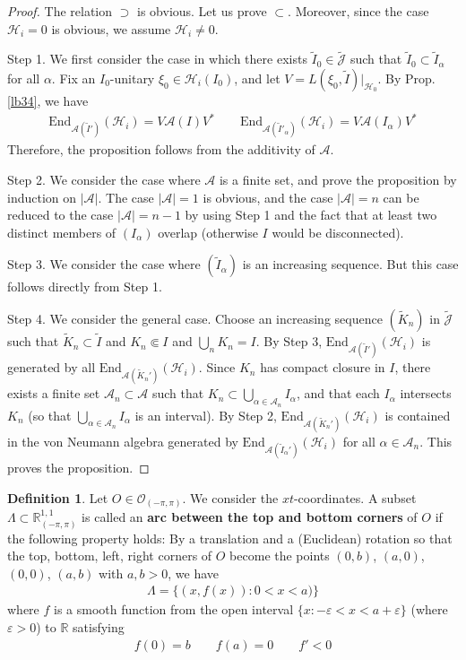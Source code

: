 \documentclass[11pt,b5paper,notitlepage]{article}
\theoremstyle{definition}
\newtheorem{df}{Definition}[section]
\theoremstyle{plain}
\newcommand{\wtd}{\widetilde}
\newcommand{\End}{\mathrm{End}} %
\newcommand{\scr}{\mathscr}
\newcommand{\Jtd}{\widetilde{\mathcal J}}
\newcommand{\Rbb}{\mathbb R}
\newcommand{\eps}{\varepsilon}
\newcommand{\MA}{\mathcal A}
\newcommand{\MH}{\mathcal H}
\newcommand{\Rpp}{\mathbb R^{1,1}_{(-\pi,\pi)}}
\newcommand{\Opp}{\mathcal O_{(-\pi,\pi)}}
\numberwithin{equation}{section}
\begin{document}
\begin{proof}
The relation $\supset$ is obvious. Let us prove $\subset$. Moreover, since the case $\MH_i=0$ is obvious, we assume $\MH_i\neq0$.

Step 1. We first consider the case in which there exists $\wtd I_0\in\Jtd$ such that $\wtd I_0\subset\wtd I_\alpha$ for all $\alpha$. Fix an $I_0$-unitary $\xi_0\in\MH_i(I_0)$, and let $V=L(\xi_0,\wtd I)|_{\MH_0}$. By Prop. \ref{lb34}, we have
\begin{align*}
\End_{\MA(\wtd I')}(\MH_i)=V\MA(I)V^*\qquad \End_{\MA(\wtd I'_\alpha)}(\MH_i)=V\MA(I_\alpha)V^*
\end{align*}
Therefore, the proposition follows from the additivity of $\MA$.

Step 2. We consider the case where $\scr A$ is a finite set, and prove the proposition by induction on $|\scr A|$. The case $|\scr A|=1$ is obvious, and the case $|\scr A|=n$ can be reduced to the case $|\scr A|=n-1$ by using Step 1 and the fact that at least two distinct members of $(I_\alpha)$ overlap (otherwise $I$ would be disconnected).

Step 3. We consider the case where $(\wtd I_\alpha)$ is an increasing sequence. But this case follows directly from Step 1.

Step 4. We consider the general case. Choose an increasing sequence $(\wtd K_n)$ in $\Jtd$ such that $\wtd K_n\subset \wtd I$ and $K_n\Subset I$ and $\bigcup_n K_n=I$. By Step 3, $\End_{\MA(\wtd I')}(\MH_i)$ is generated by all $\End_{\MA(\wtd K_n')}(\MH_i)$. Since $K_n$ has compact closure in $I$, there exists a finite set $\scr A_n\subset\scr A$ such that $K_n\subset\bigcup_{\alpha\in\scr A_n}I_\alpha$, and that each $I_\alpha$ intersects $K_n$ (so that $\bigcup_{\alpha\in\scr A_n}I_\alpha$ is an interval). By Step 2,  $\End_{\MA(\wtd K_n')}(\MH_i)$ is contained in the von Neumann algebra generated by $\End_{\MA(\wtd I_\alpha')}(\MH_i)$ for all $\alpha\in\scr A_n$. This proves the proposition.
\end{proof}




\begin{df}\label{lb70}
Let $O\in\Opp$. We consider the $xt$-coordinates. A subset $\Lambda\subset\Rpp$ is called an \textbf{arc between the top and bottom corners} of $O$ if the following property holds: By a translation and a (Euclidean) rotation so that the top, bottom, left, right corners of $O$ become the points $(0,b)$, $(a,0)$, $(0,0)$, $(a,b)$ with $a,b>0$, we have
\begin{align*}
\Lambda=\{(x,f(x)):0<x<a)\}
\end{align*}
where $f$ is a smooth function from the open interval $\{x:-\eps<x<a+\eps\}$ (where $\eps>0$) to $\Rbb$ satisfying
\begin{align*}
f(0)=b\qquad f(a)=0\qquad f'<0
\end{align*}
\end{df}
\end{document}
